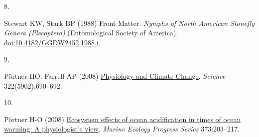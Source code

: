 \documentclass[9pt,twocolumn,twoside,]{pnas-new}
\newlength{\cslhangindent}
\newlength{\csllabelwidth}
\newlength{\cslentryspacingunit} %
\newenvironment{CSLReferences}[2] %
 {%
  \setlength{\parindent}{0pt}
  \ifodd #1
  \let\oldpar\par
  \def\par{\hangindent=\cslhangindent\oldpar}
  \fi
  \setlength{\parskip}{#2\cslentryspacingunit}
 }%
 {}
\newcommand{\CSLLeftMargin}[1]{\parbox[t]{\csllabelwidth}{#1}}
\newcommand{\CSLRightInline}[1]{\parbox[t]{\linewidth - \csllabelwidth}{#1}\break}
\begin{document}
\begin{CSLReferences}{0}{0}
\leavevmode{}%
\CSLLeftMargin{8. }%
\CSLRightInline{Stewart KW, Stark BP (1988) Front {Matter}. \emph{Nymphs
of {North} {American} {Stonefly} {Genera} ({Plecoptera})} (Entomological
Society of America).
doi:\href{https://doi.org/10.4182/GGDW2452.1988.i}{10.4182/GGDW2452.1988.i}.}

\leavevmode{}%
\CSLLeftMargin{9. }%
\CSLRightInline{Pörtner HO, Farrell AP (2008)
\href{https://doi.org/10.1126/science.1163156}{Physiology and {Climate}
{Change}}. \emph{Science} 322(5902):690--692.}

\leavevmode{}%
\CSLLeftMargin{10. }%
\CSLRightInline{Pörtner H-O (2008)
\href{https://doi.org/10.3354/meps07768}{Ecosystem effects of ocean
acidification in times of ocean warming: A physiologist's view}.
\emph{Marine Ecology Progress Series} 373:203--217.}

\end{CSLReferences}



% 
\end{document}
